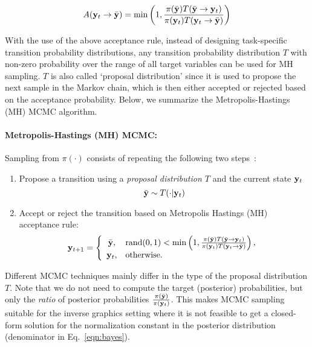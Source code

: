 \begin{equation}
A(\mathbf{y}_t\to\bar{\mathbf{y}}) = \min\left(1,\frac{\pi(\bar{\mathbf{y}})
T(\bar{\mathbf{y}} \to \mathbf{y}_t)}{\pi(\mathbf{y}_t) T(\mathbf{y}_t \to \bar{\mathbf{y}})} \right)
\end{equation}

With the use of the above acceptance rule, instead of designing task-specific
transition probability distributions,
any transition probability distribution $T$ with non-zero probability over
the range of all target variables can be used for MH sampling. $T$ is also
called `proposal distribution' since it is used to propose the next sample in the
Markov chain, which is then either accepted or rejected based on the acceptance probability.
Below, we summarize the Metropolis-Hastings (MH) MCMC algorithm.

\paragraph{Metropolis-Hastings (MH) MCMC:}
Sampling from $\pi(\cdot)$ consists of repeating the
following two steps~\cite{liu2001montecarlo}:

\begin{enumerate}
\item Propose a transition using a \textit{proposal distribution $T$}
  and the current state $\mathbf{y}_t$
\begin{equation*}
\bar{\mathbf{y}} \sim T(\cdot|\mathbf{y}_t)
\end{equation*}
\item Accept or reject the transition based on Metropolis Hastings (MH) acceptance rule:
\begin{equation*}
\mathbf{y}_{t+1} = \left\{
  \begin{array}{cl}
      \bar{\mathbf{y}},  & \textrm{rand}(0,1) < \min\left(1,\frac{\pi(\bar{\mathbf{y}})
T(\bar{\mathbf{y}} \to \mathbf{y}_t)}{\pi(\mathbf{y}_t) T(\mathbf{y}_t \to \bar{\mathbf{y}})} \right), \\
     \mathbf{y}_t, & \textrm{otherwise.}
  \end{array}
\right.
\end{equation*}
\end{enumerate}

Different MCMC techniques mainly differ in the type of the
proposal distribution $T$. Note that we do not need to compute the target (posterior)
probabilities, but only the \textit{ratio} of
posterior probabilities $\frac{\pi(\bar{\mathbf{y}})}{\pi(\mathbf{y}_t)}$.
This makes MCMC sampling suitable for the inverse graphics setting
where it is not feasible to get a closed-form solution for the normalization
constant in the posterior distribution (denominator in Eq.~\ref{eqn:bayes}).

